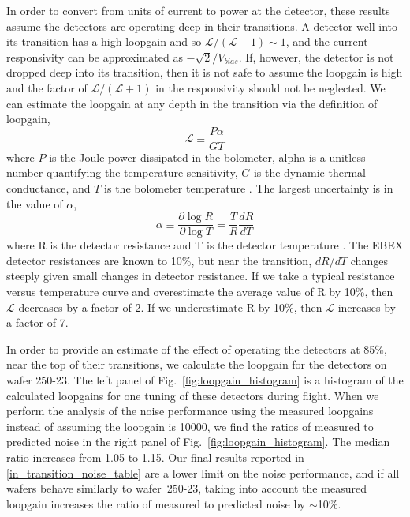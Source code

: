 \documentclass[../EBEXPaper2.tex]{subfiles}
\begin{document}
In order to convert from units of current to power at the detector, these results assume the detectors are operating deep in their transitions. 
A detector well into its transition has a high loopgain and so $\mathcal{L}/(\mathcal{L} + 1) \sim 1$, and the current responsivity can be approximated as $-\sqrt{2}/V_{bias}$. 
If, however, the detector is not dropped deep into its transition, then it is not safe to assume the loopgain is high and the factor of  $\mathcal{L}/(\mathcal{L} + 1)$ in the responsivity should not be neglected. 
We can estimate the loopgain at any depth in the transition via the definition of loopgain, 
\begin{equation}
\mathcal{L} \equiv \frac{P\alpha}{GT}
\end{equation}
where $P$ is the Joule power dissipated in the bolometer, alpha is a unitless number quantifying the temperature sensitivity, $G$ is the dynamic thermal conductance, and $T$ is the bolometer temperature \citep{irwin_book_2005}. 
The largest uncertainty is in the value of $\alpha$, 
 \begin{equation}
 \alpha \equiv \frac{\partial \log R}{\partial \log T}=\frac{T}{R} \frac{dR}{dT}
 \end{equation}
 where R is the detector resistance and T is the detector temperature \citep{irwin_book_2005}. 
The \ac{EBEX} detector resistances are known to 10\%, but near the transition, $dR/dT$ changes steeply given small changes in detector resistance. 
If we take a typical resistance versus temperature curve and overestimate the average value of R by 10\%, then $\mathcal{L}$ decreases by a factor of 2.
If we underestimate R by 10\%, then $\mathcal{L}$ increases by a factor of 7. 

In order to provide an estimate of the effect of operating the detectors at 85\%, near the top of their transitions, we calculate the loopgain for the detectors on wafer 250-23. 
The left panel of Fig.~\ref{fig:loopgain_histogram} is a histogram of the calculated loopgains for one tuning of these detectors during flight. 
When we perform the analysis of the noise performance using the measured loopgains instead of assuming the loopgain is 10000, we find the ratios of measured to predicted noise in the right panel of Fig.~\ref{fig:loopgain_histogram}. 
The median ratio increases from 1.05 to 1.15. 
Our final results reported in \TAB\ref{in_transition_noise_table} are a lower limit on the noise performance, and if all wafers behave similarly to wafer~250-23, taking into account the measured loopgain increases the ratio of measured to predicted noise by $\sim$10\%. 
\end{document}
